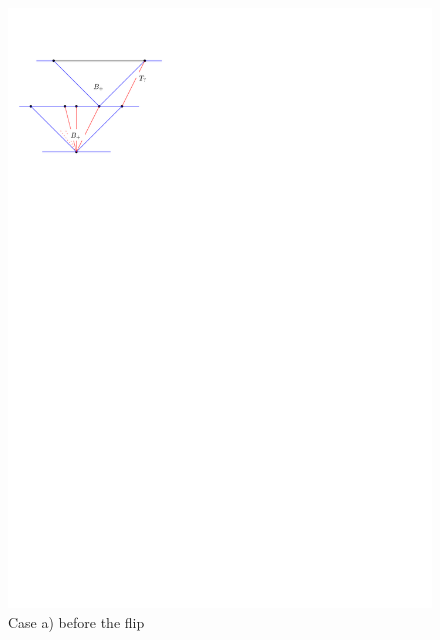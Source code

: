 \begin{figure}[h]
  \centering
  \includegraphics[scale=1]{unifiedAlgo/img/flipcasea}
  \caption{Case a) before the flip}
  \label{fig:uni:flipcasea}
\end{figure}

